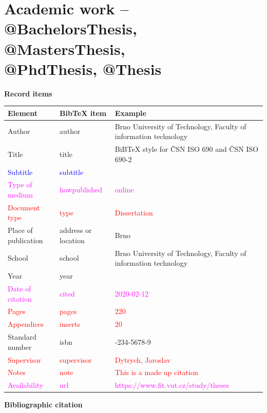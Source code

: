 \section*{Academic work -- @BachelorsThesis, @MastersThesis, \\@PhdThesis, @Thesis}
\label{pr-thesis}
\noindent \textbf{Record items}

\medskip

\begin{tabularx}{0.95\linewidth}{X X >{\raggedright\arraybackslash}X}
    Element & BibTeX item & Example\\\hline
    Author & author & Brno University of Technology, Faculty of information technology\\
    Title & title & BiBTeX style for ČSN ISO 690 and ČSN ISO 690-2\\
    \textcolor{blue}{Subtitle} & \textcolor{blue}{subtitle} & \\
    \textcolor{magenta}{Type of medium} & \textcolor{magenta}{howpublished} & \textcolor{magenta}{online}\\
    \textcolor{red}{Document type} & \textcolor{red}{type} & \textcolor{red}{Dissertation}\\
    Place of publication & address or location & Brno\\
    School & school & Brno University of Technology, Faculty of information technology\\
    Year & year & 2020\\
    \textcolor{magenta}{Date of citation} & \textcolor{magenta}{cited} & \textcolor{magenta}{2020-02-12}\\
    \textcolor{red}{Pages} & \textcolor{red}{pages} & \textcolor{red}{220}\\
    \textcolor{red}{Appendices} & \textcolor{red}{inserts} & \textcolor{red}{20}\\
    Standard number & isbn & 01-234-5678-9\\
    \textcolor{red}{Supervisor} & \textcolor{red}{supervisor} & \textcolor{red}{Dytrych, Jaroslav}\\
    \textcolor{red}{Notes} & \textcolor{red}{note} & \textcolor{red}{This is a made up citation}\\
    \textcolor{magenta}{Availability} & \textcolor{magenta}{url} & \textcolor{magenta}{https://www.fit.vut.cz/\-study/theses}\\
\end{tabularx}

\bigskip

\noindent \textbf{Bibliographic citation}

